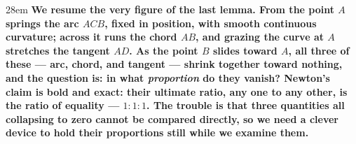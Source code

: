 \documentclass[border=4pt]{standalone}
\begin{document}
\begin{varwidth}{28em}
\large\bfseries
We resume the very figure of the last lemma. From the point $A$ springs \textcolor{arcblue}{the arc $ACB$},      fixed in position, with smooth continuous curvature; across it runs the chord $AB$, and grazing      the curve at $A$ stretches the tangent $AD$. As the point $B$ slides toward $A$, all three of      these --- \textcolor{arcblue}{arc, chord, and tangent} --- shrink together toward nothing, and the question is:      in what \emph{proportion} do they vanish? Newton's claim is bold and exact: their ultimate ratio,      any one to any other, is the \textcolor{arcblue}{ratio of equality} --- $1:1:1$. The trouble is that three      quantities all collapsing to zero cannot be compared directly, so we need a clever device to hold      their proportions still while we examine them.
\end{varwidth}
\end{document}
